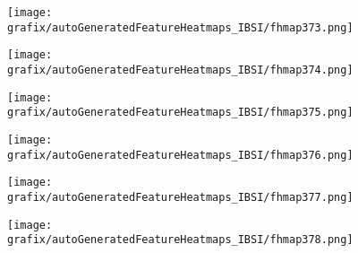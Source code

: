 \hspace{\hsp} 
\begin{subfigure}{\wid\textwidth} 
    \centering 
    \caption{\tiny \sffamily {}} 
    \vspace{\vsp} 
    \texttt{[image: grafix/autoGeneratedFeatureHeatmaps\_IBSI/fhmap373.png]} 
\end{subfigure} 
\hspace{\hsp} 
\begin{subfigure}{\wid\textwidth} 
    \centering 
    \caption{\tiny \sffamily {}} 
    \vspace{\vsp} 
    \texttt{[image: grafix/autoGeneratedFeatureHeatmaps\_IBSI/fhmap374.png]} 
\end{subfigure} 
\hspace{\hsp} 
\begin{subfigure}{\wid\textwidth} 
    \centering 
    \caption{\tiny \sffamily {}} 
    \vspace{\vsp} 
    \texttt{[image: grafix/autoGeneratedFeatureHeatmaps\_IBSI/fhmap375.png]} 
\end{subfigure} 
\hspace{\hsp} 
\begin{subfigure}{\wid\textwidth} 
    \centering 
    \caption{\tiny \sffamily {}} 
    \vspace{\vsp} 
    \texttt{[image: grafix/autoGeneratedFeatureHeatmaps\_IBSI/fhmap376.png]} 
\end{subfigure} 
\hspace{\hsp} 
\begin{subfigure}{\wid\textwidth} 
    \centering 
    \caption{\tiny \sffamily {}} 
    \vspace{\vsp} 
    \texttt{[image: grafix/autoGeneratedFeatureHeatmaps\_IBSI/fhmap377.png]} 
\end{subfigure} 
\hspace{\hsp} 
\begin{subfigure}{\wid\textwidth} 
    \centering 
    \caption{\tiny \sffamily {}} 
    \vspace{\vsp} 
    \texttt{[image: grafix/autoGeneratedFeatureHeatmaps\_IBSI/fhmap378.png]} 
\end{subfigure} 
\hspace{\hsp} 
